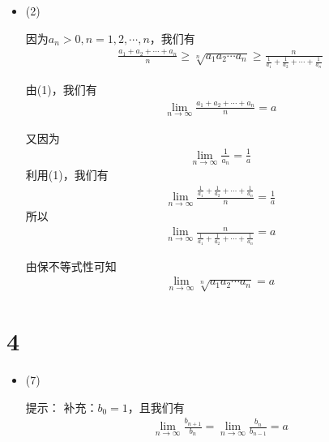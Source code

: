\documentclass{article}
\begin{document}
\begin{itemize}
        (ii)

        逆向不成立，比如
        \begin{align*}
          a_n = (-1)^n
        \end{align*}
        此时
        \begin{align*}
          \lim\limits_{n \to \infty} \frac{a_1 + a_2 + \cdots + a_n}{n} = 0
        \end{align*}
        而
        \begin{align*}
          \lim\limits_{n \to \infty} a_n
        \end{align*}
        不存在。

  \item (2)

        因为$a_n > 0, n = 1, 2, \cdots, n$，我们有
        \begin{align*}
          \frac{a_1 + a_2 + \cdots + a_n}{n} \geq \sqrt[n]{a_1 a_2 \cdots a_n} \geq \frac{n}{\frac{1}{a_1} + \frac{1}{a_2} + \cdots + \frac{1}{a_n}}
        \end{align*}

        由(1)，我们有
        \begin{align*}
          \lim\limits_{n \to \infty} \frac{a_1 + a_2 + \cdots + a_n}{n} = a
        \end{align*}

        又因为
        \begin{align*}
          \lim \limits_{n \to \infty} \frac{1}{a_n} = \frac{1}{a}
        \end{align*}
        利用(1)，我们有
        \begin{align*}
          \lim\limits_{n \to \infty} \frac{\frac{1}{a_1} + \frac{1}{a_2} + \cdots + \frac{1}{a_n}}{n}
          = \frac{1}{a}
        \end{align*}
        所以
        \begin{align*}
          \lim\limits_{n \to \infty} \frac{n}{\frac{1}{a_1} + \frac{1}{a_2} + \cdots + \frac{1}{a_n}} = a
        \end{align*}

        由保不等式性可知
        \begin{align*}
          \lim\limits_{n \to \infty} \sqrt[n]{a_1 a_2 \cdots a_n} = a
        \end{align*}
\end{itemize}

\section*{4}

\begin{itemize}
  \item (7)

        提示：
        补充：$ b_0 = 1$，且我们有
        \begin{align*}
          \lim\limits_{n \to \infty} \frac{b_{n + 1}}{b_n} = \lim\limits_{n \to \infty} \frac{b_n}{b_{n - 1}} = a
        \end{align*}

\end{itemize}
\end{document}
